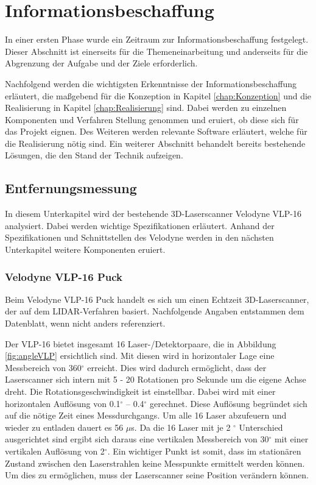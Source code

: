 \chapter{Informationsbeschaffung}
\label{Informationsbeschaffung}
 In einer ersten Phase wurde ein Zeitraum zur Informationsbeschaffung festgelegt. Dieser Abschnitt ist einerseits für die Themeneinarbeitung und anderseits für die Abgrenzung der Aufgabe und der Ziele erforderlich.

Nachfolgend werden die wichtigsten Erkenntnisse der Informationsbeschaffung erläutert, die maßgebend für die Konzeption in Kapitel \ref{chap:Konzeption} und die Realisierung in Kapitel \ref{chap:Realisierung} sind. Dabei werden zu einzelnen Komponenten und Verfahren Stellung genommen und eruiert, ob diese sich für das Projekt eignen. Des Weiteren werden relevante Software erläutert, welche für die Realisierung nötig sind. Ein weiterer Abschnitt behandelt bereits bestehende Lösungen, die den Stand der Technik aufzeigen.

\section{Entfernungsmessung}
\label{sec:Entfernungsmessung}
In diesem Unterkapitel wird der bestehende 3D-Laserscanner Velodyne VLP-16 analysiert. Dabei werden wichtige Spezifikationen erläutert. Anhand der Spezifikationen und Schnittstellen des Velodyne werden in den nächsten Unterkapitel weitere Komponenten eruiert.   

\subsection{Velodyne VLP-16 Puck}
\label{subsec:Velodyne}
Beim Velodyne VLP-16 Puck handelt es sich um einen Echtzeit 3D-Laserscanner, der auf dem \ac{LIDAR}-Verfahren basiert. Nachfolgende Angaben entstammen dem Datenblatt, wenn nicht anders referenziert. \protect\cite{velodyne}

Der VLP-16 bietet insgesamt 16 Laser-/Detektorpaare, die in Abbildung \ref{fig:angleVLP} ersichtlich sind. Mit diesen wird in horizontaler Lage eine Messbereich von 360$^\circ$  erreicht. Dies wird dadurch ermöglicht, dass der Laserscanner sich intern mit 5 - 20 Rotationen pro Sekunde um die eigene Achse dreht. Die Rotationsgeschwindigkeit ist einstellbar. Dabei wird mit einer horizontalen Auflösung von 0.1$^\circ$ – 0.4$^\circ$ gerechnet. Diese Auflösung begründet sich auf die nötige Zeit eines Messdurchgangs. Um alle 16 Laser abzufeuern und wieder zu entladen dauert es 56 $\mu$s.
Da die 16 Laser mit je 2 $^\circ$ Unterschied ausgerichtet sind ergibt sich daraus eine vertikalen Messbereich von 30$^\circ$ mit einer vertikalen Auflösung von 2$^\circ$. Ein wichtiger Punkt ist somit, dass im stationären Zustand zwischen den Laserstrahlen keine Messpunkte ermittelt werden können. Um dies zu ermöglichen, muss der Laserscanner seine Position verändern können.

